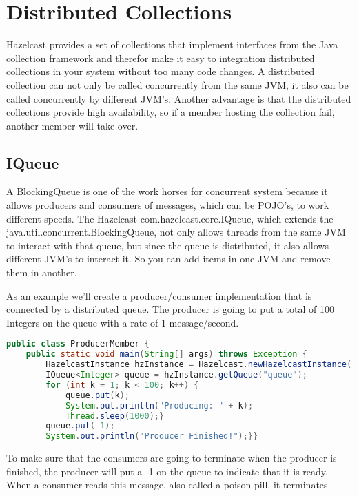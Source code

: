 \chapter{Distributed Collections}
Hazelcast provides a set of collections that implement interfaces from the Java collection framework and therefor make it easy to integration distributed collections in your system without too many code changes. A distributed collection can not only be called concurrently from the same JVM, it also can be called concurrently by different JVM's. Another advantage is that the distributed collections provide high availability, so if a member hosting the collection fail, another member will take over.

\section{IQueue}
A BlockingQueue is one of the work horses for concurrent system because it allows producers and consumers of messages, which can be POJO's, to work different speeds. The Hazelcast com.hazelcast.core.IQueue, which extends the java.util.concurrent.BlockingQueue, not only allows threads from the same JVM to interact with that queue, but since the queue is distributed, it also allows different JVM's to interact it. So you can add items in one JVM and remove them in another.

As an example we'll create a producer/consumer implementation that is connected by a distributed queue. The producer is going to put a total of 100 Integers on the queue with a rate of 1 message/second.
\begin{lstlisting}[language=java]
public class ProducerMember {
    public static void main(String[] args) throws Exception {
        HazelcastInstance hzInstance = Hazelcast.newHazelcastInstance();
        IQueue<Integer> queue = hzInstance.getQueue("queue");
        for (int k = 1; k < 100; k++) {
            queue.put(k);
            System.out.println("Producing: " + k);
            Thread.sleep(1000);}
        queue.put(-1);
        System.out.println("Producer Finished!");}}
\end{lstlisting}
To make sure that the consumers are going to terminate when the producer is finished, the producer will put a -1 on the queue to indicate that it is ready. When a consumer reads this message, also called a poison pill, it terminates. 

